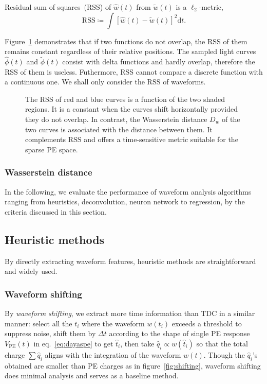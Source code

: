 Residual sum of squares~(RSS) of $\hat{w}(t)$ from $\tilde{w}(t)$ is a $\ell_2$-metric,
\begin{equation}
  \label{eq:rss}
  \mathrm{RSS} \coloneqq\int\left[\hat{w}(t) - \tilde{w}(t)\right]^2\mathrm{d}t.
\end{equation}

Figure~\ref{fig:l2} demonstrates that if two functions do not overlap, the $\mathrm{RSS}$ of them remains constant regardless of their relative positions.  The sampled light curves $\hat{\phi}(t)$ and $\tilde{\phi}(t)$ consist with delta functions and hardly overlap, therefore the $\mathrm{RSS}$ of them is useless.  Futhermore, RSS cannot compare a discrete function with a continuous one.  We shall only consider the $\mathrm{RSS}$ of waveforms.

\begin{figure}[H]
  \centering
  \resizebox{0.6\textwidth}{!}{}
  \caption{\label{fig:l2} The $\mathrm{RSS}$ of red and blue curves is a function of the two shaded regions. It is a constant when the curves shift horizontally provided they do not overlap.  In contrast, the Wasserstein distance $D_w$ of the two curves is associated with the distance between them.  It complements $\mathrm{RSS}$ and offers a time-sensitive metric suitable for the sparse PE space.}
\end{figure}

\subsubsection{Wasserstein distance}
\label{sec:W-dist}



In the following, we  evaluate the performance of waveform analysis algorithms ranging from heuristics, deconvolution, neuron network to regression, by the criteria discussed in this section.

\subsection{Heuristic methods}
By directly extracting waveform features, heuristic methods are straightforward and widely used. 

\subsubsection{Waveform shifting}
\label{sec:shifting}
By \textit{waveform shifting}, we extract more time information than TDC in a similar manner: select all the $t_i$ where the waveform $w(t_i)$ exceeds a threshold to suppress noise, shift them by $\Delta t$ according to the shape of single PE response $V_\mathrm{PE}(t)$ in eq.~\eqref{eq:dayaspe} to get $\hat{t}_i$, then take $\hat{q}_i \propto w(\hat{t}_i)$ so that the total charge $\sum \hat{q}_i$ aligns with the integration of the waveform $w(t)$.  Though the $\hat{q}_i$'s obtained are smaller than PE charges as in figure~\ref{fig:shifting}, waveform shifting does minimal analysis and serves as a baseline method.

